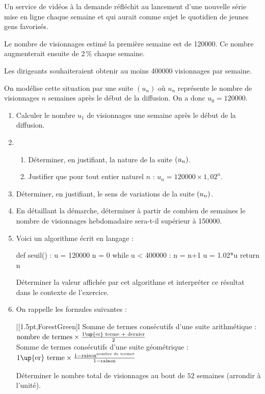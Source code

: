 \documentclass[a4paper,11pt]{article}
\begin{document}

\medskip

Un service de vidéos à la demande réfléchit au lancement d'une nouvelle série mise en ligne chaque semaine et qui aurait comme sujet le quotidien de jeunes gens favorisés.

Le nombre de visionnages estimé la première semaine est de \num{120000}. Ce nombre augmenterait ensuite de 2\,\% chaque semaine.

Les dirigeants souhaiteraient obtenir au moins \num{400000} visionnages par semaine.

On modélise cette situation par une suite $\left(u_n\right)$ où $u_n$ représente le nombre de visionnages $n$ semaines après le début de la diffusion. On a donc $u_0 = \num{120000}$.

\begin{enumerate}
	\item Calculer le nombre $u_1$ de visionnages une semaine après le début de la diffusion. 
	\item 
	\begin{enumerate}
		\item Déterminer, en justifiant, la nature de la suite $\left( u_n \right)$.
		\item Justifier que pour tout entier naturel $n$ : $u_n = \num{120000} \times  1,02^n$.
	\end{enumerate}
	\item Déterminer, en justifiant, le sens de variations de la suite $\left( u_n \right)$.
	\item En détaillant la démarche, déterminer à partir de combien de semaines le nombre de visionnages hebdomadaire sera-t-il supérieur à \num{150000}.
	\item Voici un algorithme écrit en langage \calgpython{} :
	
	\begin{envpythonnoline}[0.4\linewidth]
		def seuil() :
			u = 120000
			n = 0
			while u < 400000 :
				n = n+1
				u = 1.02*u
			return n
	\end{envpythonnoline}
	
	Déterminer la valeur affichée par cet algorithme et interpréter ce résultat dans le contexte de l'exercice.
	
	\item On rappelle les formules suivantes :
	
	\hspace{0.5cm}%
	\begin{tblr}{|[1.5pt,ForestGreen]l}
		Somme de termes consécutifs d'une suite arithmétique : $\text{nombre de termes} \times \frac{\text{1\up{er} terme + dernier}}{2}$ \\
		Somme de termes consécutifs d'une suite géométrique : $\text{1\up{er} terme} \times \frac{1 - \text{raison}^{\text{nombre de termes}}}{1 - \text{raison}}$
	\end{tblr}
	
	\medskip
	
	Déterminer le nombre total de visionnages au bout de $52$ semaines (arrondir à l'unité).
\end{enumerate}
\end{document}
